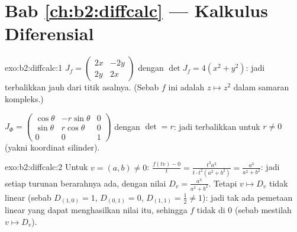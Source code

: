 \section*{Bab \ref{ch:b2:diffcalc} --- Kalkulus Diferensial}

\begin{solution}{exo:b2:diffcalc:1}
$J_f = \begin{pmatrix} 2x & -2y\\ 2y & 2x\end{pmatrix}$ dengan $\det J_f
= 4(x^2 + y^2)$: jadi terbalikkan jauh dari titik asalnya. (Sebab $f$ ini adalah $z
\mapsto z^2$ dalam samaran kompleks.)

$J_\Phi = \begin{pmatrix} \cos\theta & -r\sin\theta & 0\\
\sin\theta & r\cos\theta & 0\\ 0 & 0 & 1\end{pmatrix}$ dengan $\det = r$:
jadi terbalikkan untuk $r \neq 0$ (yakni koordinat silinder).
\end{solution}

\begin{solution}{exo:b2:diffcalc:2}
Untuk $v = (a, b) \neq 0$: $\frac{f(tv) - 0}{t} = \frac{t^3a^3}{t\cdot
t^2(a^2+b^2)} = \frac{a^3}{a^2 + b^2}$: jadi setiap turunan berarahnya
ada, dengan nilai $D_v = \frac{a^3}{a^2+b^2}$. Tetapi $v
\mapsto D_v$ tidak linear (sebab $D_{(1,0)} = 1$, $D_{(0,1)} = 0$,
$D_{(1,1)} = \frac12 \neq 1$): jadi tak ada pemetaan linear yang dapat menghasilkan nilai
itu, sehingga $f$ tidak  di $0$ (sebab 
mestilah $v \mapsto D_v$).
\end{solution}

